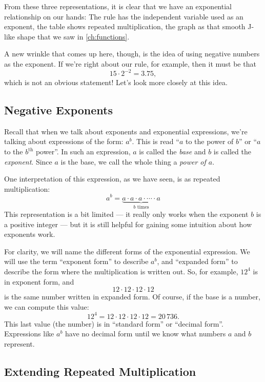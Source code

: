 From these three representations, it is clear that we have an exponential relationship on our hands: The rule has the independent variable used as an exponent, the table shows repeated multiplication, the graph as that smooth J-like shape that we saw in \cref{ch:functions}.

A new wrinkle that comes up here, though, is the idea of using negative numbers as the exponent. If we're right about our rule, for example, then it must be that \[15 \cdot 2^{-2} = 3.75,\]
which is not an obvious statement! Let's look more closely at this idea.

\subsection{Negative Exponents}
\label{sec:exponegative}

Recall that when we talk about exponents and exponential expressions, we're talking about expressions of the form: $a^b$. This is read ``$a$ to the power of $b$'' or ``$a$ to the $b^{\text{th}}$ power''. In such an expression, $a$ is called the \textit{base} and $b$ is called the \textit{exponent}. Since $a$ is the base, we call the whole thing a \textit{power of $a$}.

One interpretation of this expression, as we have seen, is as repeated multiplication:
\[a^b = \underbrace{a \cdot a \cdot a \cdot \dotsm \cdot a}_{\text{$b$ times}}\]
This representation is a bit limited --- it really only works when the exponent $b$ is a positive integer --- but it is still helpful for gaining some intuition about how exponents work.

For clarity, we will name the different forms of the exponential expression. We will use the term ``exponent form'' to describe $a^b$, and  ``expanded form'' to describe the form where the multiplication is written out. So, for example, $12^4$ is in exponent form, and \[12\cdot12\cdot12\cdot12\] is the same number written in expanded form. Of course, if the base is a number, we can compute this value: \[12^4 = 12\cdot12\cdot12\cdot12 = 20\,736.\] This last value (the number) is in ``standard form'' or ``decimal form''. Expressions like $a^b$ have no decimal form until we know what numbers $a$ and $b$ represent.

\subsection{Extending Repeated Multiplication}

